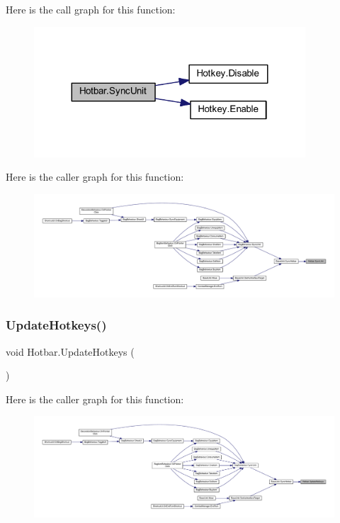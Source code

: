 Here is the call graph for this function\+:\nopagebreak
\begin{figure}[H]
\begin{center}
\leavevmode
\includegraphics[width=287pt]{class_hotbar_a1e796a0a133ee0743aa8585c05980f9b_cgraph}
\end{center}
\end{figure}
Here is the caller graph for this function\+:\nopagebreak
\begin{figure}[H]
\begin{center}
\leavevmode
\includegraphics[width=350pt]{class_hotbar_a1e796a0a133ee0743aa8585c05980f9b_icgraph}
\end{center}
\end{figure}
\mbox{\label{class_hotbar_a1b1cab633f4bf2347af2c0f04fa4b856}} 
\subsubsection{\texorpdfstring{UpdateHotkeys()}{UpdateHotkeys()}}
{\footnotesize\ttfamily void Hotbar.\+Update\+Hotkeys (\begin{DoxyParamCaption}{ }\end{DoxyParamCaption})}

Here is the caller graph for this function\+:\nopagebreak
\begin{figure}[H]
\begin{center}
\leavevmode
\includegraphics[width=350pt]{class_hotbar_a1b1cab633f4bf2347af2c0f04fa4b856_icgraph}
\end{center}
\end{figure}


